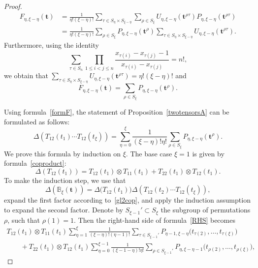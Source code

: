 \documentclass[pdftex]{sigma}
\numberwithin{equation}{section}
\begin{document}
\begin{proof}
\begin{align*}%
F_{\eta,\xi-\eta}(\boldsymbol{t})&{}=\frac{1}{\eta!(\xi-\eta)!} \sum_{\tau\in S_\eta\times S_{\xi-\eta}} \sum_{\rho\in S_\xi} U_{\eta,\xi-\eta}(\boldsymbol{t}^{\rho\tau}) P_{\eta,\xi-\eta}(\boldsymbol{t}^{\rho\tau})\\
&{}=\frac{1}{\eta!(\xi-\eta)!} \sum_{\rho\in S_\xi} P_{\eta,\xi-\eta}(\boldsymbol{t}^{\rho}) \sum_{\tau\in S_\eta\times S_{\xi-\eta}} U_{\eta,\xi-\eta}(\boldsymbol{t}^{\rho\tau}).
\end{align*}
Furthermore, using the identity
\begin{equation}
\label{n!}
\sum_{\tau\in S_n} \prod_{1\leq i<j\leq n} \frac{x_{\tau(i)}-x_{\tau(j)}-1}{x_{\tau(i)}-x_{\tau(j)}}=n!,
\end{equation}
we obtain that
$
\sum_{\tau\in S_\eta\times S_{\xi-\eta}}U_{\eta,\xi-\eta}(\boldsymbol{t}^{\rho\tau})=\eta!(\xi-\eta)!$
 and
\begin{equation}\label{formF}
F_{\eta,\xi-\eta}(\boldsymbol{t})=\sum_{\rho\in S_\xi} P_{\eta,\xi-\eta}(\boldsymbol{t}^\rho).
\end{equation}

Using formula~\eqref{formF}, the statement of Proposition~\ref{twotensorsA} can be formulated as follows:
\begin{equation}\label{state}
\Delta ( T_{12} (t_{1} ) \cdots T_{12} (t_{\xi} ) )=\sum_{\eta=0}^\xi \frac{1}{(\xi-\eta)!\eta!}\sum_{\rho\in S_\xi} P_{\eta,\xi-\eta}(\boldsymbol{t}^\rho).
\end{equation}
We prove this formula by induction on $\xi$. The base case $\xi=1$ is given by formula~\eqref{coproduct}:
\begin{equation}\label{gl2cop}
\Delta(T_{12} (t_1))=T_{12} (t_1)\otimes T_{11} (t_1)+T_{22} (t_1)\otimes T_{12} (t_1).
\end{equation}
To make the induction step, we use that
\begin{equation}\label{RHS}
\Delta ( {\mathbb{B}}_\xi(\boldsymbol{t}) )=\Delta\bigl(T_{12} (t_1)\bigr) \Delta (T_{12} (t_2)\cdots T_{12} (t_\xi)),
\end{equation}
expand the first factor according to~\eqref{gl2cop}, and apply the induction assumption to expand the second factor. Denote by $S_{\xi-1}'\subset S_\xi$ the subgroup of permutations $\rho$, such that $\rho(1)=1$. Then the right-hand side of formula~\eqref{RHS} becomes{\samepage
\begin{gather}
T_{12} (t_1)\otimes T_{11} (t_1)\sum_{\eta=1}^{\xi}\frac{1}{(\xi-\eta)!(\eta-1)!} \sum_{\tau\in S_{\xi-1}'} P_{\eta-1,\xi-\eta}\bigl(t_{\tau(2)},\dots,t_{\tau(\xi)}\bigr)\nonumber\\
\qquad{}+T_{22} (t_1)\otimes T_{12} (t_1) \sum_{\eta=0}^{\xi-1}\frac{1}{(\xi-1-\eta)!\eta!} \sum_{\rho\in S_{\xi-1}'} P_{\eta,\xi-\eta-1}\bigl(t_{\rho(2)},\dots,t_{\rho(\xi)}\bigr),\label{TTF}
\end{gather}}%


\end{proof}
\end{document}
